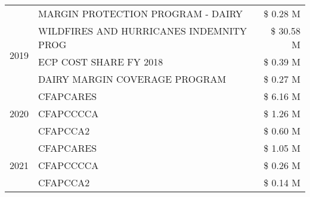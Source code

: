 \begin{tabular}{llr}
 & MARGIN PROTECTION PROGRAM - DAIRY & \$ 0.28 M \\
\cline{1-3}
\multirow[t]{3}{*}{2019} & WILDFIRES AND HURRICANES INDEMNITY PROG & \$ 30.58 M \\
 & ECP COST SHARE FY 2018 & \$ 0.39 M \\
 & DAIRY MARGIN COVERAGE PROGRAM & \$ 0.27 M \\
\cline{1-3}
\multirow[t]{3}{*}{2020} & CFAPCARES & \$ 6.16 M \\
 & CFAPCCCCA & \$ 1.26 M \\
 & CFAPCCA2 & \$ 0.60 M \\
\cline{1-3}
\multirow[t]{3}{*}{2021} & CFAPCARES & \$ 1.05 M \\
 & CFAPCCCCA & \$ 0.26 M \\
 & CFAPCCA2 & \$ 0.14 M \\
\cline{1-3}
\bottomrule
\end{tabular}
